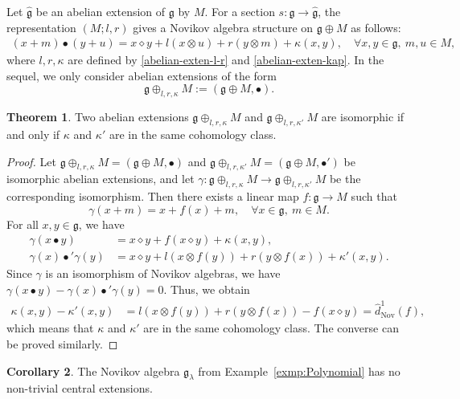 \documentclass[12pt]{amsart}
\theoremstyle{definition}
\newtheorem{thm}{Theorem}[section]
\newtheorem{cor}[thm]{Corollary}
\newcommand{\g}{\mathfrak g}
\newcommand{\ot}{\otimes}
\begin{document}
Let $\hat{\g}$ be an abelian extension of $\g$ by $M$. For a section $s:\g\to\hat{\g}$, the representation $(M;l,r)$ gives a Novikov algebra structure on $\g\oplus M$ as follows:
\begin{align*}
	(x+m)\bullet (y+u)=x\diamond y+l(x\ot u)+r(y\ot m)+\kappa(x,y),\quad\forall x,y\in\g,\ m,u\in M,
\end{align*}
where $l,r,\kappa$ are defined by \eqref{abelian-exten-l-r} and \eqref{abelian-exten-kap}.
In the sequel, we only consider abelian extensions of the form
\[
\g\oplus_{l,r,\kappa} M:=(\g\oplus M,\bullet).
\]

\begin{thm}
	Two abelian extensions $\g\oplus_{l,r,\kappa} M$ and $\g\oplus_{l,r,\kappa'} M$ are isomorphic if and only if $\kappa$ and $\kappa'$ are in the same cohomology class.
\end{thm}

\begin{proof}
Let $\g\oplus_{l,r,\kappa} M=(\g\oplus M,\bullet)$ and $\g\oplus_{l,r,\kappa'} M=(\g\oplus M,\bullet')$ be isomorphic abelian extensions, and let $\gamma:\g\oplus_{l,r,\kappa} M\to \g\oplus_{l,r,\kappa'} M$ be the corresponding isomorphism. Then there exists a linear map $f:\g\to M$ such that
\[
\gamma(x+m)=x+f(x)+m,\quad \forall x\in\g,\ m\in M.
\]
For all $x,y\in\g$, we have
\begin{align*}
		\gamma(x\bullet y)&=x\diamond y+f(x\diamond y)+\kappa(x,y),\\
		\gamma(x)\bullet'\gamma(y)&=x\diamond y+l(x\ot f(y))+r(y\ot f(x))+\kappa'(x,y).
\end{align*}
Since $\gamma$ is an isomorphism of Novikov algebras, we have $\gamma(x\bullet y)-\gamma(x)\bullet'\gamma(y)=0$. Thus, we obtain
\begin{align*}
		\kappa(x,y)-\kappa'(x,y)&=l(x\ot f(y))+r(y\ot f(x))-f(x\diamond y)=\hat{d}_{\mathrm{Nov}}^1(f),
\end{align*}
which means that $\kappa$ and $\kappa'$ are in the same cohomology class. The converse can be proved similarly.
\end{proof}


\begin{cor}
The Novikov algebra $\g_\lambda $ from Example~\ref{exmp:Polynomial}
has no non-trivial  {central} extensions.
\end{cor}




\end{document}
